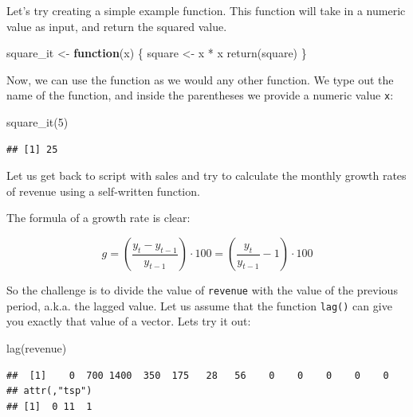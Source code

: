 \documentclass[
  12pt,
  oneside]{book}
\newenvironment{Shaded}{\begin{snugshade}}{\end{snugshade}}
\newcommand{\ControlFlowTok}[1]{\textcolor[rgb]{0.13,0.29,0.53}{\textbf{#1}}}
\newcommand{\DecValTok}[1]{\textcolor[rgb]{0.00,0.00,0.81}{#1}}
\newcommand{\FunctionTok}[1]{\textcolor[rgb]{0.00,0.00,0.00}{#1}}
\newcommand{\NormalTok}[1]{#1}
\newcommand{\OtherTok}[1]{\textcolor[rgb]{0.56,0.35,0.01}{#1}}
\newcommand{\SpecialCharTok}[1]{\textcolor[rgb]{0.00,0.00,0.00}{#1}}
\theoremstyle{definition}
\theoremstyle{definition}
\theoremstyle{definition}
\theoremstyle{definition}
\theoremstyle{remark}
\begin{document}
Let's try creating a simple example function. This function will take in a numeric value as input, and return the squared value.

\begin{Shaded}
\begin{Highlighting}[]
\NormalTok{square\_it }\OtherTok{\textless{}{-}} \ControlFlowTok{function}\NormalTok{(x) \{ }
\NormalTok{   square }\OtherTok{\textless{}{-}}\NormalTok{ x }\SpecialCharTok{*}\NormalTok{ x}
   \FunctionTok{return}\NormalTok{(square)}
\NormalTok{\} }
\end{Highlighting}
\end{Shaded}

Now, we can use the function as we would any other function. We type out the name of the function, and inside the parentheses we provide a numeric value \texttt{x}:

\begin{Shaded}
\begin{Highlighting}[]
\FunctionTok{square\_it}\NormalTok{(}\DecValTok{5}\NormalTok{)}
\end{Highlighting}
\end{Shaded}

\begin{verbatim}
## [1] 25
\end{verbatim}

Let us get back to script with sales and try to calculate the monthly growth rates of revenue using a self-written function.

The formula of a growth rate is clear:

\[ g=\left(\frac{y_t-y_{t-1}}{y_{t-1}}\right)\cdot 100=\left(\frac{y_t}{y_{t-1}}-1\right)\cdot 100 \]

So the challenge is to divide the value of \texttt{revenue} with the value of the previous period, a.k.a. the lagged value. Let us assume that the function \texttt{lag()} can give you exactly that value of a vector. Lets try it out:

\begin{Shaded}
\begin{Highlighting}[]
\FunctionTok{lag}\NormalTok{(revenue)}
\end{Highlighting}
\end{Shaded}

\begin{verbatim}
##  [1]    0  700 1400  350  175   28   56    0    0    0    0    0
## attr(,"tsp")
## [1]  0 11  1
\end{verbatim}
\end{document}
